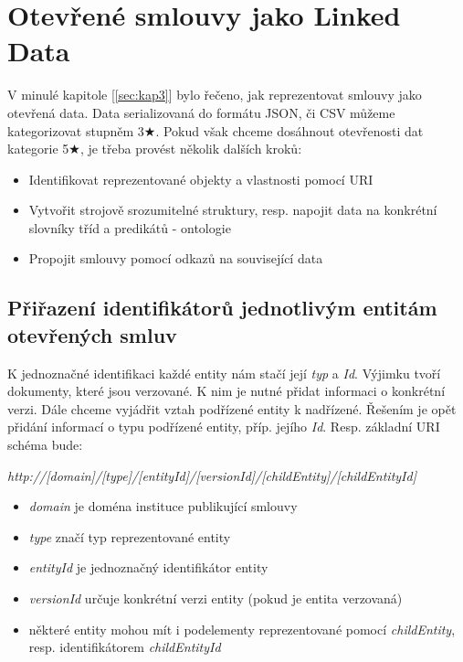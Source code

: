 \chapter{Otevřené smlouvy jako Linked Data}
\label{sec:kap4}

V minulé kapitole [\ref{sec:kap3}] bylo řečeno, jak reprezentovat smlouvy jako otevřená data. Data serializovaná do formátu JSON, či CSV můžeme kategorizovat stupněm 3$\bigstar$. Pokud však chceme dosáhnout otevřenosti dat kategorie 5$\bigstar$, je třeba provést několik dalších kroků:

\begin{itemize}
\item Identifikovat reprezentované objekty a vlastnosti pomocí URI
\item Vytvořit strojově srozumitelné struktury, resp. napojit data na konkrétní slovníky tříd a predikátů - ontologie
\item Propojit smlouvy pomocí odkazů na související data
\end{itemize}

\section{Přiřazení identifikátorů jednotlivým entitám otevřených smluv}

K jednoznačné identifikaci každé entity nám stačí její \textit{typ} a \textit{Id}. Výjimku tvoří dokumenty, které jsou verzované. K nim je nutné přidat informaci o konkrétní verzi. Dále chceme vyjádřit vztah podřízené entity k nadřízené. Řešením je opět přidání informací o typu podřízené entity, příp. jejího \textit{Id}. Resp. základní URI schéma bude:

\bigskip

\textit{http://[domain]/[type]/[entityId]/[versionId]/[childEntity]/[childEntityId]}
\begin{itemize}
\item \textit{domain} je doména instituce publikující smlouvy
\item \textit{type} značí typ reprezentované entity
\item \textit{entityId} je jednoznačný identifikátor entity
\item \textit{versionId} určuje konkrétní verzi entity (pokud je entita verzovaná)
\item některé entity mohou mít i podelementy reprezentované pomocí \textit{childEntity}, resp. identifikátorem \textit{childEntityId}
\end{itemize}

